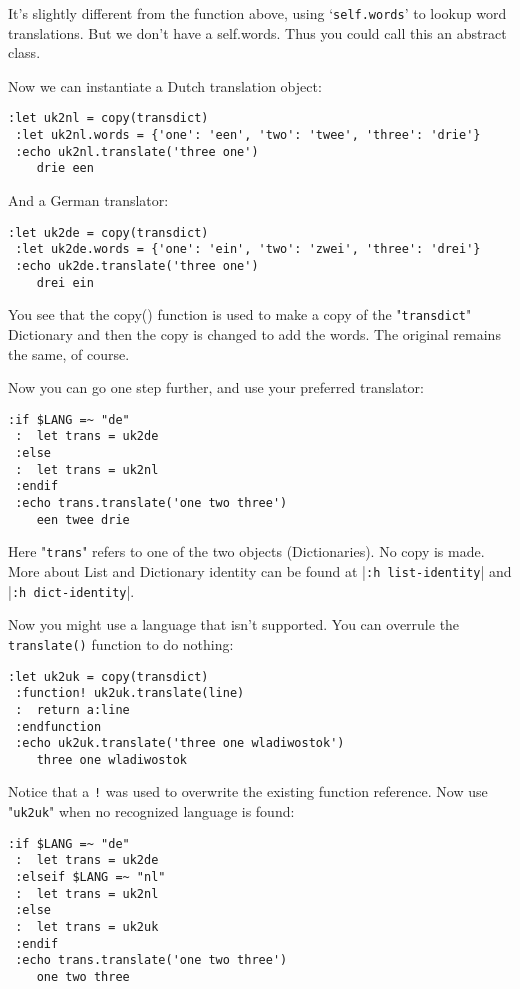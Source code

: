 It's slightly different from the function above, using `\texttt{self.words}' to lookup word translations.
But we don't have a self.words.
Thus you could call this an abstract class.

Now we can instantiate a Dutch translation object:

\begin{Verbatim}[samepage=true]
 :let uk2nl = copy(transdict)
 :let uk2nl.words = {'one': 'een', 'two': 'twee', 'three': 'drie'}
 :echo uk2nl.translate('three one')
    drie een
\end{Verbatim}

And a German translator:

\begin{Verbatim}[samepage=true]
 :let uk2de = copy(transdict)
 :let uk2de.words = {'one': 'ein', 'two': 'zwei', 'three': 'drei'}
 :echo uk2de.translate('three one')
    drei ein
\end{Verbatim}

You see that the copy() function is used to make a copy of the "\texttt{transdict}" Dictionary and then the copy is changed to add the words.
The original remains the same, of course.

Now you can go one step further, and use your preferred translator:

\begin{Verbatim}[samepage=true]
 :if $LANG =~ "de"
 :  let trans = uk2de
 :else
 :  let trans = uk2nl
 :endif
 :echo trans.translate('one two three')
    een twee drie
\end{Verbatim}

Here "\texttt{trans}" refers to one of the two objects (Dictionaries).
No copy is made.
More about List and Dictionary identity can be found at |\texttt{:h list-identity}| and |\texttt{:h dict-identity}|.

Now you might use a language that isn't supported.
You can overrule the \texttt{translate()} function to do nothing:

\begin{Verbatim}[samepage=true]
 :let uk2uk = copy(transdict)
 :function! uk2uk.translate(line)
 :  return a:line
 :endfunction
 :echo uk2uk.translate('three one wladiwostok')
    three one wladiwostok
\end{Verbatim}

Notice that a \texttt{!} was used to overwrite the existing function reference.
Now use "\texttt{uk2uk}" when no recognized language is found:

\begin{Verbatim}[samepage=true]
 :if $LANG =~ "de"
 :  let trans = uk2de
 :elseif $LANG =~ "nl"
 :  let trans = uk2nl
 :else
 :  let trans = uk2uk
 :endif
 :echo trans.translate('one two three')
    one two three
\end{Verbatim}


